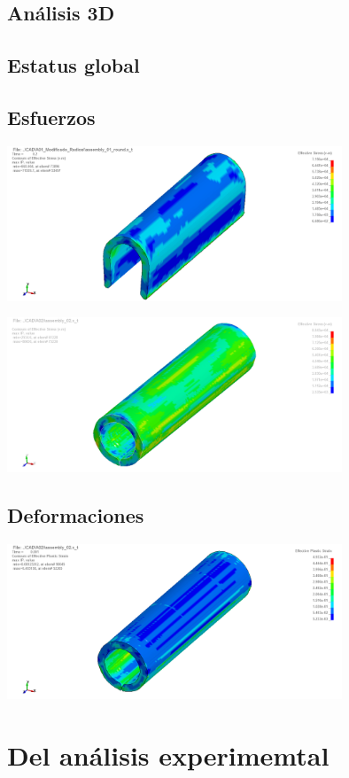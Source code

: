 \subsection{Análisis 3D}


\subsection{Estatus global}



\subsection{Esfuerzos}


\begin{center}
\includegraphics[width=0.75\textwidth]{src/ch4/von_mises_3D_01.png}
\label{fig:von_mises_3D_01}
\end{center}

\begin{center}
\includegraphics[width=0.75\textwidth]{src/ch4/von_mises_3D_02.png}
\label{fig:von_mises_3D_02}
\end{center}

\subsection{Deformaciones}

\begin{center}
\includegraphics[width=0.75\textwidth]{src/ch4/eqv_strain_01.png}
\label{fig:eqv_strain_01}
\end{center}




\section{Del análisis experimemtal}


